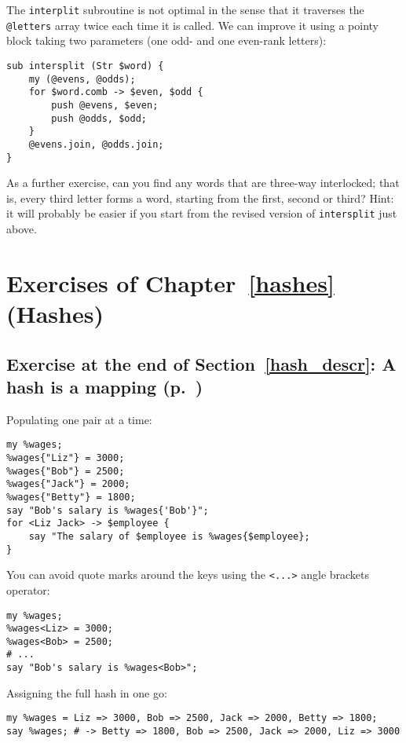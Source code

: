 The {\tt interplit} subroutine is not optimal in the 
sense that it traverses the \verb'@letters' array twice 
each time it is called. We can improve it using a pointy 
block taking two parameters (one odd- and one even-rank 
letters):
\begin{verbatim}
sub intersplit (Str $word) {
    my (@evens, @odds);
    for $word.comb -> $even, $odd {
        push @evens, $even;
        push @odds, $odd;
    }
    @evens.join, @odds.join;
}
\end{verbatim}

As a further exercise, can you find any words that are 
three-way interlocked; that is, every third letter forms a 
word, starting from the first, second or third? Hint: it 
will probably be easier if you start from the revised 
version of {\tt intersplit} just above.

\section{Exercises of Chapter~\ref{hashes} (Hashes)}

\subsection{Exercise at the end of Section~\ref{hash_descr}: A hash is a mapping (p.~\pageref{ex_employees})}
\label{sol_ex_employees}

Populating one pair at a time:

\begin{verbatim}
my %wages;
%wages{"Liz"} = 3000;
%wages{"Bob"} = 2500;
%wages{"Jack"} = 2000;
%wages{"Betty"} = 1800;
say "Bob's salary is %wages{'Bob'}";
for <Liz Jack> -> $employee {
    say "The salary of $employee is %wages{$employee};
}
\end{verbatim}

You can avoid quote marks around the keys using 
the \verb'<...>' angle brackets operator:

\begin{verbatim}
my %wages;
%wages<Liz> = 3000;
%wages<Bob> = 2500;
# ...
say "Bob's salary is %wages<Bob>";
\end{verbatim}

Assigning the full hash in one go:

\begin{verbatim}
my %wages = Liz => 3000, Bob => 2500, Jack => 2000, Betty => 1800;
say %wages; # -> Betty => 1800, Bob => 2500, Jack => 2000, Liz => 3000
\end{verbatim}

